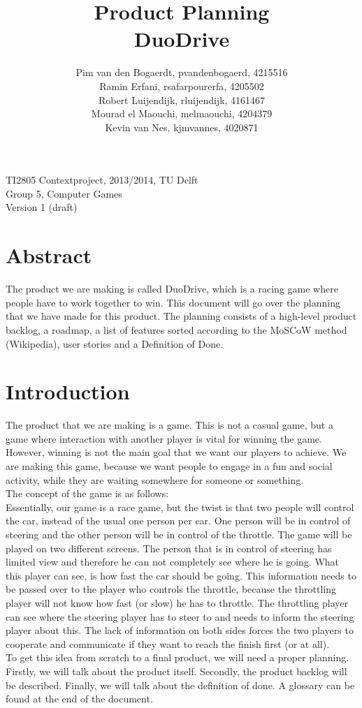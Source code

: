 \documentclass[11pt,twoside,a4paper]{article}
\title{
  Product Planning\\
  DuoDrive
}
\author{
	Pim van den Bogaerdt, pvandenbogaerd, 4215516\\
	Ramin Erfani, rsafarpourerfa, 4205502\\
	Robert Luijendijk, rluijendijk, 4161467\\
	Mourad el Maouchi, melmaouchi, 4204379\\
	Kevin van Nes, kjmvannes, 4020871
}
\begin{document}
\maketitle

\begin{center}
TI2805 Contextproject, 2013/2014, TU Delft\\
Group 5, Computer Games\\
Version 1 (draft)
\end{center}

\newpage

\section*{Abstract}
The product we are making is called DuoDrive, which is a racing game where people have to work together to win. This document will go over the planning that we have made for this product. The planning consists of a high-level product backlog, a roadmap, a list of features sorted according to the MoSCoW method (Wikipedia), user stories and a Definition of Done.


\newpage

\tableofcontents


\newpage

\section{Introduction}
The product that we are making is a game. This is not a casual game, but a game where interaction with another player is vital for winning the game. However, winning is not the main goal that we want our players to achieve. We are making this game, because we want people to engage in a fun and social activity, while they are waiting somewhere for someone or something.\\
The concept of the game is as follows:\\
Essentially, our game is a race game, but the twist is that two people will control the car, instead of the usual one person per car. One person will be in control of steering and the other person will be in control of the throttle. The game will be played on two different screens. The person that is in control of steering has limited view and therefore he can not completely see where he is going. What this player can see, is how fast the car should be going. This information needs to be passed over to the player who controls the throttle, because the throttling player will not know how fast (or slow) he has to throttle. The throttling player can see where the steering player has to steer to and needs to inform the steering player about this. The lack of information on both sides forces the two players to cooperate and communicate if they want to reach the finish first (or at all).\\
To get this idea from scratch to a final product, we will need a proper planning. Firstly, we will talk about the product itself. Secondly, the product backlog will be described. Finally, we will talk about the definition of done. A glossary can be found at the end of the document.
\end{document}

